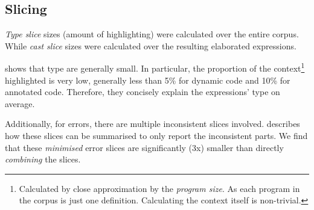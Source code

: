 \subsection{Slicing}
\textit{Type slice} sizes (amount of highlighting) were calculated over the entire corpus. While \textit{cast slice} sizes were calculated over the resulting elaborated expressions.

 shows that type are generally small. In particular, the proportion of the context\footnote{Calculated by close approximation by the \textit{program size}. As each program in the corpus is just one definition. Calculating the context itself is non-trivial.} highlighted is very low, generally less than 5\% for dynamic code and 10\% for annotated code. Therefore, they concisely explain the expressions' type on average.

Additionally, for errors, there are multiple inconsistent slices involved.  describes how these slices can be summarised to only report the inconsistent parts. We find that these \textit{minimised} error slices are significantly (3x) smaller than directly \textit{combining} the slices.

